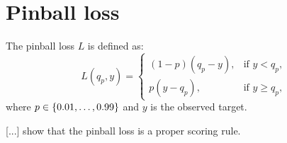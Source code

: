 \section{Pinball loss}
\label{sec:pinball-loss}

The pinball loss \(L\) is defined as: 
\[ L(q_p, y) = \begin{cases}
    (1-p)(q_p - y), &\text{if } y < q_p, \\
    p(y - q_p), &\text{if } y \geq q_p,
\end{cases} \]
where \(p \in \{0.01, \ldots, 0.99\}\) and \(y\) is the observed target.

[...] show that the pinball loss is a proper scoring rule.